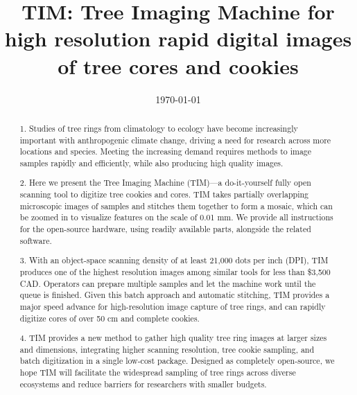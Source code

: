 \documentclass[a4paper,12pt]{article}
\title{TIM: Tree Imaging Machine for high resolution rapid digital images of tree cores and cookies}
\date{\today}
\begin{document}
\linenumbers
\doublespacing
\maketitle

\begin{abstract}  

1.  Studies of tree rings from climatology to ecology have become increasingly important with anthropogenic climate change, driving a need for research across more locations and species. Meeting the increasing demand requires methods to image samples rapidly and efficiently, while also producing high quality images. %

2.  Here we present the Tree Imaging Machine (TIM)---a do-it-yourself fully open scanning tool to digitize tree cookies and cores. TIM takes partially overlapping microscopic images of samples and stitches them together to form a mosaic, which can be zoomed in to visualize features on the scale of 0.01 mm. 
We provide all instructions for the open-source hardware, using readily available parts, alongside the related software. %

3. With an object-space scanning density of at least 21,000 dots per inch (DPI), TIM produces one of the highest resolution images among similar tools for less than \$3,500 CAD. Operators can prepare multiple samples and let the machine work until the queue is finished. Given this batch approach and automatic stitching, TIM provides a major speed advance for high-resolution image capture of tree rings, and can rapidly digitize cores of over 50 cm and complete cookies. %

4. TIM provides a new method to gather high quality tree ring images at larger sizes and dimensions, integrating higher scanning resolution, tree cookie sampling, and batch digitization in a single low-cost package. 
Designed as completely open-source, we hope TIM will facilitate the widespread sampling of tree rings across diverse ecosystems and reduce barriers for researchers with smaller budgets. 

\end{abstract}
\end{document}
